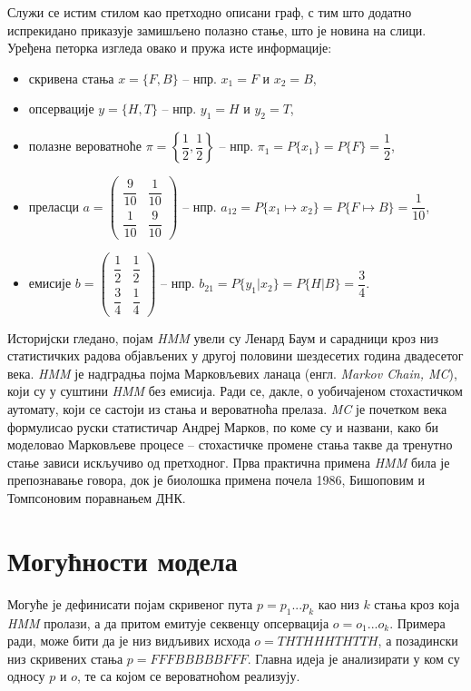 \documentclass[12pt,oneside]{memoir}
\begin{document}
\begin{CJK}{UTF8}{ipxm}
Служи се истим стилом као претходно описани граф, с тим што додатно испрекидано приказује замишљено полазно стање, што је новина на слици. Уређена петорка изгледа овако и пружа исте информације:
\begin{itemize}
  \item скривена стања $x = \{F, B\}$ -- нпр. $x_1 = F$ и $x_2 = B$,
  \item опсервације $y = \{H, T\}$ -- нпр. $y_1 = H$ и $y_2 = T$,
  \item полазне вероватноће $\pi = \left\{\dfrac{1}{2}, \dfrac{1}{2}\right\}$ -- нпр. $\pi_1 = P\{x_1\} = P\{F\} = \dfrac{1}{2}$,
  \item преласци $a = \left(\begin{matrix}\dfrac{9}{10} & \dfrac{1}{10}\\[8pt] \dfrac{1}{10} & \dfrac{9}{10}\end{matrix}\right)$ -- нпр. $a_{12} = P\{x_1 \mapsto x_2\} = P\{F \mapsto B\} = \dfrac{1}{10}$,
  \item емисије $b = \left(\begin{matrix}\dfrac{1}{2} & \dfrac{1}{2}\\[8pt] \dfrac{3}{4} & \dfrac{1}{4}\end{matrix}\right)$ -- нпр. $b_{21} = P\{y_1 | x_2\} = P\{H | B\} = \dfrac{3}{4}$.
\end{itemize}

Историјски гледано, појам \textit{HMM} увели су Ленард Баум и сарадници кроз низ статистичких радова објављених у другој половини шездесетих година двадесетог века\cite{baum1966}. \textit{HMM} је надградња појма Марковљевих ланаца (енгл. \textit{Markov Chain, MC}), који су у суштини \textit{HMM} без емисија. Ради се, дакле, о уобичајеном стохастичком аутомату, који се састоји из стања и вероватноћа прелаза. \textit{MC} је почетком века формулисао руски статистичар Андреј Марков, по коме су и названи, како би моделовао Марковљеве процесе -- стохастичке промене стања такве да тренутно стање зависи искључиво од претходног\cite{markov1906}. Прва практична примена \textit{HMM} била је препознавање говора, док је биолошка примена почела 1986, Бишоповим и Томпсоновим поравнањем ДНК\cite{bishop1986}.

\section{Могућности модела}
Могуће је дефинисати појам скривеног пута $p = p_1...p_k$ као низ $k$ стања кроз која \textit{HMM} пролази, а да притом емитује секвенцу опсервација $o = o_1...o_k$. Примера ради, може бити да је низ видљивих исхода $o = THTHHHTHTTH$, а позадински низ скривених стања $p = FFFBBBBBFFF$. Главна идеја је анализирати у ком су односу $p$ и $o$, те са којом се вероватноћом реализују.


\end{CJK}
\end{document}
